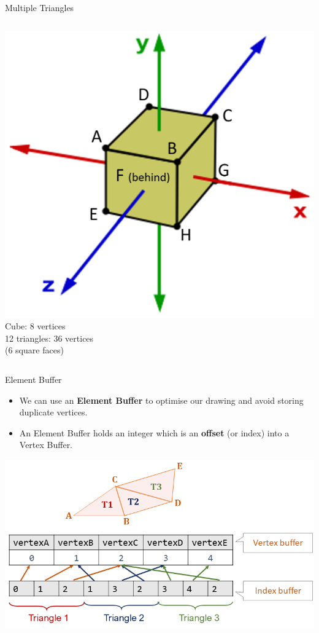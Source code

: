 \begin{frame}{Multiple Triangles}
\begin{columns}
\begin{column}{0.45\textwidth}
\begin{center}
				\pause\includegraphics[height=0.3\textheight]{cube_vertices}\\
				Cube: 8 vertices\\
				12 triangles: 36 vertices\\
				(6 square faces)
			\end{center}
		\end{column}
	\end{columns}
\end{frame}

\begin{frame}{Element Buffer}
	\begin{itemize}
		\pause\item We can use an \textbf{Element Buffer} to optimise our drawing and avoid storing duplicate vertices.
		\pause\item An Element Buffer holds an integer which is an \textbf{offset} (or index) into a Vertex Buffer.
	\end{itemize}
	\begin{center}
		\pause\includegraphics[height=0.5\textheight]{element_buffer}
	\end{center}	
\end{frame}


